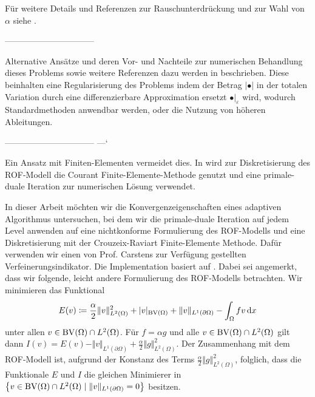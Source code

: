 Für weitere Details und Referenzen zur Rauschunterdrückung und zur Wahl von
$\alpha$ siehe \cite{Get12}.

\medskip
--------------------------------
\medskip

Alternative Ansätze und deren Vor- und Nachteile zur numerischen Behandlung
dieses Problems sowie weitere
Referenzen dazu werden in \cite[1165]{Bar12} beschrieben.
Diese beinhalten eine Regularisierung des Problems indem 
der Betrag $|\bullet|$ in der totalen Variation durch eine
differenzierbare Approximation ersetzt $\bullet|_\varepsilon$ wird, wodurch
Standardmethoden anwendbar werden,
oder die Nutzung von höheren Ableitungen. 

\medskip
--------------------------------
---`\cite[Kapitel~10.1.3]{Bar15}
\medskip

Ein Ansatz mit Finiten-Elementen vermeidet dies.
In \cite[Kapitel 10]{Bar15} wird zur Diskretisierung des
ROF-Modell die Courant Finite-Elemente-Methode genutzt und eine primale-duale
Iteration zur numerischen Lösung verwendet.

In dieser Arbeit möchten wir die Konvergenzeigenschaften eines adaptiven
Algorithmus untersuchen, bei dem wir die primale-duale Iteration auf jedem
Level anwenden auf eine nichtkonforme Formulierung des ROF-Modells und eine
Diskretisierung mit der Crouzeix-Raviart Finite-Elemente Methode.
Dafür verwenden wir einen von Prof. Carstens zur Verfügung gestellten 
Verfeinerungsindikator. Die Implementation basiert auf \cite{Car09}.
Dabei sei angemerkt, dass wir folgende, leicht andere Formulierung des 
ROF-Modells betrachten. Wir minimieren das Funktional
\begin{align*}
  E(v)\coloneqq \frac{\alpha}{2}\Vert v\Vert_{L^2(\Omega)}^2 + |v|_{\textup{BV}(\Omega)}
  +\Vert v\Vert_{L^1(\partial\Omega)}-\int_\Omega fv\,\mathrm{d}x
\end{align*}
unter allen $v\in\textup{BV}(\Omega)\cap L^2(\Omega)$.
Für $f = \alpha g$ und alle $v\in \textup{BV}(\Omega)\cap
L^2(\Omega)$ gilt dann $I(v) =
E(v) - \Vert v\Vert_{L^1(\partial \Omega)}+ \frac{\alpha}{2}\Vert
g\Vert_{L^2(\Omega)}^2$. 
Der Zusammenhang mit dem ROF-Modell ist, aufgrund der Konstanz des Terms
$\frac{\alpha}{2}\Vert g\Vert_{L^2(\Omega)}^2$, folglich, dass die Funktionale
$E$ und $I$ die gleichen Minimierer in $\left\{v\in\textup{BV}(\Omega)\cap
L^2(\Omega)\mid \Vert v\Vert_{L^1(\partial\Omega)}=0\right\}$ besitzen.

